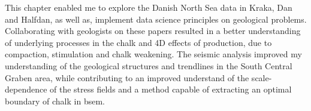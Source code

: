 This chapter enabled me to explore the Danish North Sea data in Kraka, Dan and Halfdan, as well as, implement data science principles on geological problems. Collaborating with geologists on these papers resulted in a better understanding of underlying processes in the chalk and 4D effects of production, due to compaction, stimulation and chalk weakening. The seismic analysis improved my understanding of the geological structures and trendlines in the South Central Graben area, while contributing to an improved understand of the scale-dependence of the stress fields and a method capable of extracting an optimal boundary of chalk in \ac{bsem}. 